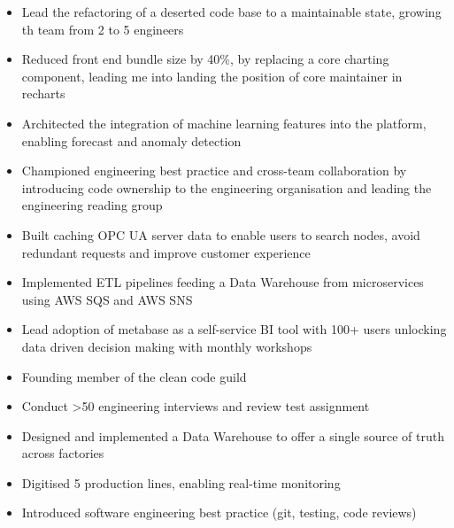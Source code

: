 \documentclass[10pt,a4paper,ragged2e,withhyper]{altacv}
\begin{document}
\begin{paracol}{2}


\begin{itemize}
\item Lead the refactoring of a deserted code base to a maintainable state, growing th team from 2 to 5 engineers
\item Reduced front end bundle size by 40\%, by replacing a core charting component, leading me into landing the position of core maintainer in recharts
\item Architected the integration of machine learning features into the platform, enabling forecast and anomaly detection
\item Championed engineering best practice and cross-team collaboration by introducing code ownership to the engineering organisation and leading the engineering reading group
\item Built caching OPC UA server data to enable users to search nodes, avoid redundant requests and improve customer experience
\end{itemize}


\divider

\begin{itemize}
\item Implemented ETL pipelines feeding a Data Warehouse from microservices using AWS SQS and AWS SNS
\item Lead adoption of metabase as a self-service BI tool with 100+ users unlocking data driven decision making with monthly workshops
\item Founding member of the clean code guild
\item Conduct >50 engineering interviews and review test assignment
\end{itemize}


\divider

\begin{itemize}
\item Designed and implemented a Data Warehouse to offer a single source of truth across factories
\item Digitised 5 production lines, enabling real-time monitoring
\item Introduced software engineering best practice (git, testing, code reviews)
\end{itemize}


\end{paracol}
\end{document}
